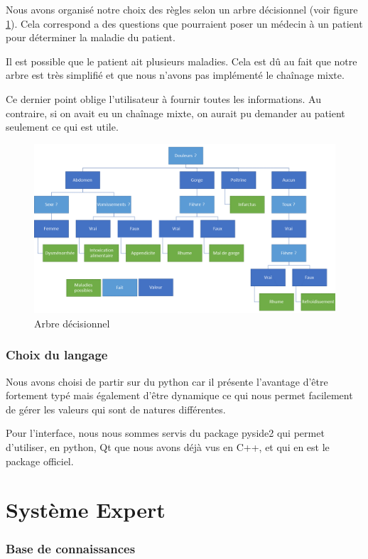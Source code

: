 \documentclass[a4paper, 11pt]{article}
\begin{document}
Nous avons organisé notre choix des règles selon un arbre décisionnel (voir figure \ref{arbre}). Cela correspond a des questions que pourraient poser un médecin à un patient pour déterminer la maladie du patient.

Il est possible que le patient ait plusieurs maladies. Cela est dû au fait que notre arbre est très simplifié et que nous n'avons pas implémenté le chaînage mixte.

Ce dernier point oblige l'utilisateur à fournir toutes les informations. Au contraire, si on avait eu un chaînage mixte, on aurait pu demander au patient seulement ce qui est utile. 

\begin{figure}[H]
    \centering
    \includegraphics[width=15cm]{arbre.png}
    \caption{\label{arbre} Arbre décisionnel}
\end{figure}

\section{Choix du langage}

Nous avons choisi de partir sur du python car il présente l'avantage d'être fortement typé mais également d'être dynamique ce qui nous permet facilement de gérer les valeurs qui sont de natures différentes.

Pour l'interface, nous nous sommes servis du package pyside2 qui permet d'utiliser, en python, Qt que nous avons déjà vus en C++, et qui en est le package officiel.

\part{Système Expert}

\section{Base de connaissances}
\end{document}

